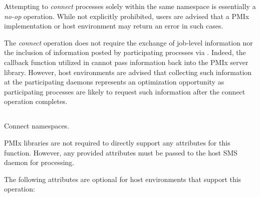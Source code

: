 \adviceuserstart
Attempting to \textit{connect} processes solely within the same namespace is essentially a \textit{no-op} operation. While not explicitly prohibited, users are advised that a \ac{PMIx} implementation or host environment may return an error in such cases.
\adviceuserend

\advicermstart
The \textit{connect} operation does not require the exchange of job-level information nor the inclusion of information posted by  participating processes via . Indeed, the callback function utilized in  cannot pass information back into the \ac{PMIx} server library. However, host environments are advised that collecting such information at the participating daemons represents an optimization opportunity as participating processes are likely to request such information after the connect operation completes.
\advicermend


\subsection{}

\summary

Connect namespaces.

\format


\begin{arglist}
\end{arglist}

\returnsimple

\reqattrstart
\ac{PMIx} libraries are not required to directly support any attributes for this function. However, any provided attributes must be passed to the host \ac{SMS} daemon for processing.

\reqattrend

\optattrstart
The following attributes are optional for host environments that support this operation:

